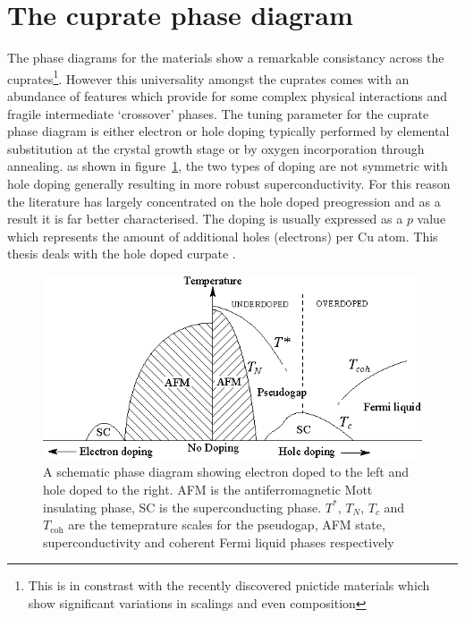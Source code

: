 
\section{The cuprate phase diagram}

The phase diagrams for the \highTc materials show a remarkable consistancy across the cuprates\footnote{This is in constrast with the recently discovered pnictide materials which show significant variations in scalings and even composition}. However this universality amongst the cuprates comes with an abundance of features which provide for some complex physical interactions and fragile intermediate `crossover' phases. The tuning parameter for the cuprate phase diagram is either electron or hole doping typically performed by elemental substitution at the crystal growth stage or by oxygen incorporation through annealing. as shown in figure~\ref{Fig:Intro:ElecHolePhaseDiagram}, the two types of doping are not symmetric with hole doping generally resulting in more robust superconductivity. For this reason the literature has largely concentrated on the hole doped preogression and as a result it is far better characterised. The doping is usually expressed as a $p$ value which represents the amount of additional holes (electrons) per Cu atom.  This thesis deals with the hole doped curpate \BSCO.
\begin{figure}[htbp]
    \begin{center}
        \includegraphics[scale=0.9]{Chapter-Introduction/Figures/ElecHolePhaseDiagram/ElecHolePhaseDiagram}
        \caption{A schematic phase diagram showing electron doped to the left and hole doped to the right. AFM is the antiferromagnetic Mott insulating phase, SC is the superconducting phase. $T^*$, $T_N$, $T_c$ and $T_{\textrm{coh}}$ are the temeprature scales for the pseudogap, AFM state, superconductivity and coherent Fermi liquid phases respectively}
        \label{Fig:Intro:ElecHolePhaseDiagram}
    \end{center}
\end{figure}

